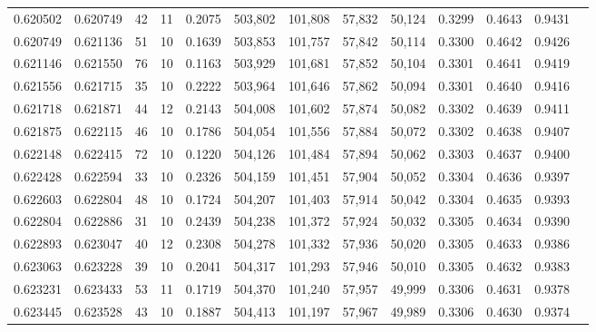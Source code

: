 \begin{tabular}{rrrrrrrrrrrrr}
0.620502 & 0.620749 &    42 &  11 &                                     0.2075 & 503,802 & 101,808 &  57,832 &  50,124 & 0.3299 & 0.4643 & 0.9431 \\
0.620749 & 0.621136 &    51 &  10 &                                     0.1639 & 503,853 & 101,757 &  57,842 &  50,114 & 0.3300 & 0.4642 & 0.9426 \\
0.621146 & 0.621550 &    76 &  10 &                                     0.1163 & 503,929 & 101,681 &  57,852 &  50,104 & 0.3301 & 0.4641 & 0.9419 \\
0.621556 & 0.621715 &    35 &  10 &                                     0.2222 & 503,964 & 101,646 &  57,862 &  50,094 & 0.3301 & 0.4640 & 0.9416 \\
0.621718 & 0.621871 &    44 &  12 &                                     0.2143 & 504,008 & 101,602 &  57,874 &  50,082 & 0.3302 & 0.4639 & 0.9411 \\
0.621875 & 0.622115 &    46 &  10 &                                     0.1786 & 504,054 & 101,556 &  57,884 &  50,072 & 0.3302 & 0.4638 & 0.9407 \\
0.622148 & 0.622415 &    72 &  10 &                                     0.1220 & 504,126 & 101,484 &  57,894 &  50,062 & 0.3303 & 0.4637 & 0.9400 \\
0.622428 & 0.622594 &    33 &  10 &                                     0.2326 & 504,159 & 101,451 &  57,904 &  50,052 & 0.3304 & 0.4636 & 0.9397 \\
0.622603 & 0.622804 &    48 &  10 &                                     0.1724 & 504,207 & 101,403 &  57,914 &  50,042 & 0.3304 & 0.4635 & 0.9393 \\
0.622804 & 0.622886 &    31 &  10 &                                     0.2439 & 504,238 & 101,372 &  57,924 &  50,032 & 0.3305 & 0.4634 & 0.9390 \\
0.622893 & 0.623047 &    40 &  12 &                                     0.2308 & 504,278 & 101,332 &  57,936 &  50,020 & 0.3305 & 0.4633 & 0.9386 \\
0.623063 & 0.623228 &    39 &  10 &                                     0.2041 & 504,317 & 101,293 &  57,946 &  50,010 & 0.3305 & 0.4632 & 0.9383 \\
0.623231 & 0.623433 &    53 &  11 &                                     0.1719 & 504,370 & 101,240 &  57,957 &  49,999 & 0.3306 & 0.4631 & 0.9378 \\
0.623445 & 0.623528 &    43 &  10 &                                     0.1887 & 504,413 & 101,197 &  57,967 &  49,989 & 0.3306 & 0.4630 & 0.9374 \\

\end{tabular}
